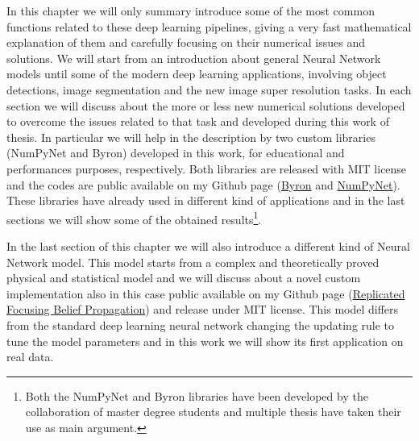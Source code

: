 \documentclass{standalone}
\begin{document}
In this chapter we will only summary introduce some of the most common functions related to these deep learning pipelines, giving a very fast mathematical explanation of them and carefully focusing on their numerical issues and solutions.
We will start from an introduction about general Neural Network models until some of the modern deep learning applications, involving object detections, image segmentation and the new image super resolution tasks.
In each section we will discuss about the more or less new numerical solutions developed to overcome the issues related to that task and developed during this work of thesis.
In particular we will help in the description by two custom libraries (\textsf{NumPyNet} and \textsf{Byron}) developed in this work, for educational and performances purposes, respectively.
Both libraries are released with MIT license and the codes are public available on my Github page (\href{https://github.com/Nico-Curti/Byron}{Byron} and \href{https://github.com/Nico-Curti/NumPyNet}{NumPyNet}).
These libraries have already used in different kind of applications and in the last sections we will show some of the obtained results\footnote{
  Both the \textsf{NumPyNet} and \textsf{Byron} libraries have been developed by the collaboration of master degree students and multiple thesis have taken their use as main argument.
}.

In the last section of this chapter we will also introduce a different kind of Neural Network model.
This model starts from a complex and theoretically proved physical and statistical model and we will discuss about a novel custom implementation also in this case public available on my Github page (\href{https://github.com/Nico-Curti/rFBP}{Replicated Focusing Belief Propagation}) and release under MIT license.
This model differs from the standard deep learning neural network changing the updating rule to tune the model parameters and in this work we will show its first application on real data.
\end{document}
